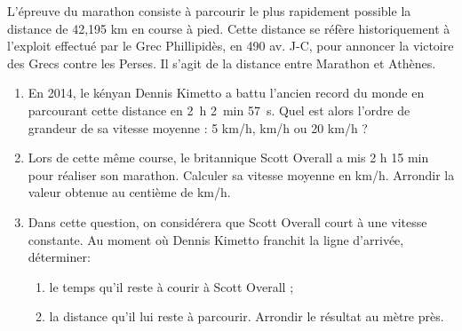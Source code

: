 
\medskip

L'épreuve du marathon consiste à parcourir le plus rapidement possible la distance de
42,195 km en course à pied. Cette distance se réfère historiquement à l'exploit effectué
par le Grec Phillipidès, en 490 av. J-C, pour annoncer la victoire des Grecs contre
les Perses. Il s'agit de la distance entre Marathon et Athènes.

\medskip

\begin{enumerate}
\item En 2014, le kényan Dennis Kimetto a battu l'ancien record du monde en
parcourant cette distance en 2~h 2~min 57~s. Quel est alors l'ordre de grandeur
de sa vitesse moyenne : 5 km/h, km/h ou 20 km/h ?
\item Lors de cette même course, le britannique Scott Overall a mis 2 h 15 min
pour réaliser son marathon. Calculer sa vitesse moyenne en km/h. Arrondir la
valeur obtenue au centième de km/h.
\item Dans cette question, on considérera que Scott Overall court à une vitesse
constante. Au moment où Dennis Kimetto franchit la ligne d'arrivée,
déterminer:
	\begin{enumerate}
		\item le temps qu'il reste à courir à Scott Overall ;
		\item la distance qu'il lui reste à parcourir. Arrondir le résultat au mètre près.
	\end{enumerate}
\end{enumerate}

\vspace{0,5cm}

